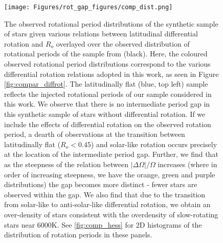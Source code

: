 \begin{figure}
\centering
  \texttt{[image: Figures/rot\_gap\_figures/comp\_dist.png]}
  \caption[The observed rotational period distributions of the synthetic sample of stars given various relations between latitudinal differential rotation and $R_o$ overlayed over the observed distribution of rotational periods of the \kepler{} sample from \citet{mcquillan_rotation_2014} (black).]{
  	The observed rotational period distributions of the synthetic sample of stars given various relations between latitudinal differential rotation and $R_o$ overlayed over the observed distribution of rotational periods of the \kepler{} sample from \citet{mcquillan_rotation_2014} (black). Here, the coloured observed rotational period distributions correspond to the various differential rotation relations adopted in this work, as seen in Figure \ref{fig:compar_diffrot}. The latitudinally flat (blue, top left) sample reflects the injected rotational periods of our sample considered in this work. We observe that there is no intermediate period gap in this synthetic sample of stars without differential rotation. If we include the effects of differential rotation on the observed rotation period, a dearth of observations at the transition between latitudinally flat ($R_o<0.45$) and solar-like rotation occurs precisely at the location of the intermediate period gap. 
 Further, we find that as the steepness of the relation between $|\Delta \Omega| / \Omega$ increases (where in order of increasing steepness, we have the orange, green and purple distributions) the gap becomes more distinct - fewer stars are observed within the gap. We also find that due to the transition from solar-like to anti-solar-like differential rotation, we obtain an over-density of stars consistent with the overdensity of slow-rotating stars near 6000K. See \ref{fig:comp_hess} for 2D histograms of the distribution of rotation periods in these panels.}
  \label{fig:comp_dist}
\end{figure}

